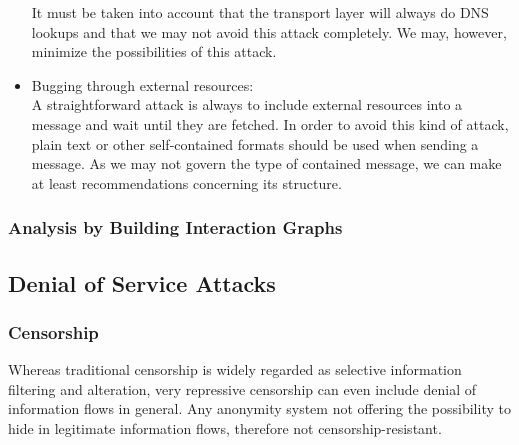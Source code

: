 \begin{itemize}
	It must be taken into account that the transport layer will always do DNS lookups and that we may not avoid this attack completely. We may, however, minimize the possibilities of this attack.
	
	\item Bugging through external resources:\\
	A straightforward attack is always to include external resources into a message and wait until they are fetched. In order to avoid this kind of attack, plain text or other self-contained formats should be used when sending a message. As we may not govern the type of contained message, we can make at least recommendations concerning its structure.
\end{itemize}

\subsubsection{Analysis by Building Interaction Graphs\label{sec:analysisInteractionGraphs}}

\subsection{Denial of Service Attacks}
\subsubsection{Censorship}
Whereas traditional censorship is widely regarded as selective information filtering and alteration, very repressive censorship can even include denial of information flows in general. Any anonymity system not offering the possibility to hide in legitimate information flows, therefore not censorship-resistant.

